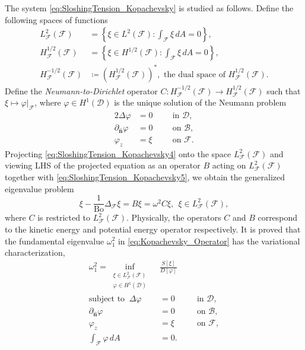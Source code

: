 \documentclass[letterpaper, 12pt]{amsart}
\newcommand{\bond}{\mathrm{Bo}}
\newcommand{\D}{\mathcal{D}}
\newcommand{\B}{\mathcal{B}}
\newcommand{\F}{\mathcal{F}}
\newcommand{\n}{\mathbf{\hat{n}}}
\begin{document}
The system \eqref{eq:SloshingTension_Kopachevsky} is studied as follows.  Define the following spaces of functions
\begin{align*}
L_{\F}^2(\F) & = \left\{\xi\in L^2(\F)\colon \int_{\F} \xi\, dA = 0\right\}, \\
H_{\F}^{1/2}(\F) & = \left\{\xi\in H^{1/2}(\F)\colon \int_{\F} \xi\, dA = 0\right\}, \\
H_{\F}^{-1/2}(\F) & \coloneqq\left(H_{\F}^{1/2}(\F)\right)^*, \textrm{ the dual space of }H_{\F}^{1/2}(\F).
\end{align*}
Define the \emph{Neumann-to-Dirichlet} operator $C\colon H_{\F}^{-1/2}(\F)\longrightarrow H^{1/2}_{\F}(\F)$ such that $\xi \mapsto\varphi|_\F$, where $\varphi\in H^1(\D)$ is the unique solution of the Neumann problem 
\begin{alignat*}{2}
\Delta\varphi &=0 && \ \ \textrm{ in }\D, \\ 
\partial_\n\varphi &= 0 && \ \ \textrm{ on }\B, \\ 
\varphi_z & = \xi  && \ \ \textrm{ on }\F.  
\end{alignat*}
Projecting \eqref{eq:SloshingTension_Kopachevsky4} onto the space $L_{\F}^2(\F)$ and viewing LHS of the projected equation as an operator $B$ acting on $L_{\F}^2(\F)$ together with \eqref{eq:SloshingTension_Kopachevsky5}, we obtain the generalized eigenvalue problem
\begin{equation}
\xi - \frac{1}{\bond}\Delta_\F\xi = B\xi = \omega^2C\xi, \ \ \xi\in L_{\F}^2(\F), \label{eq:Kopachevsky_Operator}
\end{equation}
where $C$ is restricted to $L_{\F}^2(\F)$. Physically, the operators $C$ and $B$ correspond to the kinetic energy and potential energy operator respectively. 
It is proved that the fundamental eigenvalue $\omega_1^2$ in \eqref{eq:Kopachevsky_Operator} has the  variational characterization, 
\begin{subequations}
 \label{eq:Kopachevsky_VF}
\begin{alignat}{2}
\label{eq:Kopachevsky_VFa}
\omega_1^2 = \inf_{\substack{\xi\in L_{\F}^2(\F) \\ \varphi\in H^1(\D)}}  \ & \frac{S[\xi]}{D[\varphi]}  \\ 
\label{eq:Kopachevsky_VFb}
\text{subject to } \ \Delta\varphi & = 0  && \ \ \textrm{ in }\D, \\ 
\label{eq:Kopachevsky_VFc}
\partial_\n\varphi & = 0 && \ \ \textrm{ on }\B,  \\ 
\label{eq:Kopachevsky_VFd}
\varphi_z & = \xi && \ \ \textrm{ on }\F, \\ 
\label{eq:Kopachevsky_VFe}
\int_\F\varphi\, dA & = 0.
\end{alignat}
\end{subequations}
\end{document}
